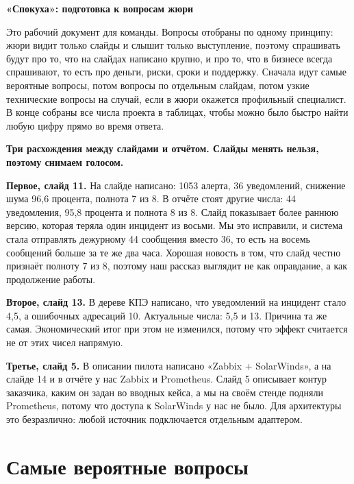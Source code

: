 \documentclass[11pt]{article}
\begin{document}
{\LARGE\bfseries «Спокуха»: подготовка к вопросам жюри}

\vspace{0.6em}
Это рабочий документ для команды. Вопросы отобраны по одному принципу: жюри
видит только слайды и слышит только выступление, поэтому спрашивать будут про
то, что на слайдах написано крупно, и про то, что в бизнесе всегда спрашивают,
то есть про деньги, риски, сроки и поддержку. Сначала идут самые вероятные
вопросы, потом вопросы по отдельным слайдам, потом узкие технические вопросы
на случай, если в жюри окажется профильный специалист. В конце собраны все
числа проекта в таблицах, чтобы можно было быстро найти любую цифру прямо во
время ответа.

\vspace{0.6em}
\colorbox{warnbg}{\parbox{\dimexpr\textwidth-2\fboxsep}{%
\textbf{Три расхождения между слайдами и отчётом. Слайды менять нельзя,
поэтому снимаем голосом.}
\smallskip

\textbf{Первое, слайд 11.} На слайде написано: 1053 алерта, 36 уведомлений,
снижение шума 96,6 процента, полнота 7 из 8. В отчёте стоят другие числа:
44 уведомления, 95,8 процента и полнота 8 из 8. Слайд показывает более раннюю
версию, которая теряла один инцидент из восьми. Мы это исправили, и система
стала отправлять дежурному 44 сообщения вместо 36, то есть на восемь сообщений
больше за те же два часа. Хорошая новость в том, что слайд честно признаёт
полноту 7 из 8, поэтому наш рассказ выглядит не как оправдание, а как
продолжение работы.
\smallskip

\textbf{Второе, слайд 13.} В дереве КПЭ написано, что уведомлений на инцидент
стало 4,5, а ошибочных адресаций 10. Актуальные числа: 5,5 и 13. Причина та
же самая. Экономический итог при этом не изменился, потому что эффект считается
не от этих чисел напрямую.
\smallskip

\textbf{Третье, слайд 5.} В описании пилота написано «Zabbix + SolarWinds», а
на слайде 14 и в отчёте у нас Zabbix и Prometheus. Слайд 5 описывает контур
заказчика, каким он задан во вводных кейса, а мы на своём стенде подняли
Prometheus, потому что доступа к SolarWinds у нас не было. Для архитектуры это
безразлично: любой источник подключается отдельным адаптером.}}

\tableofcontents

\section{Самые вероятные вопросы}
\end{document}
